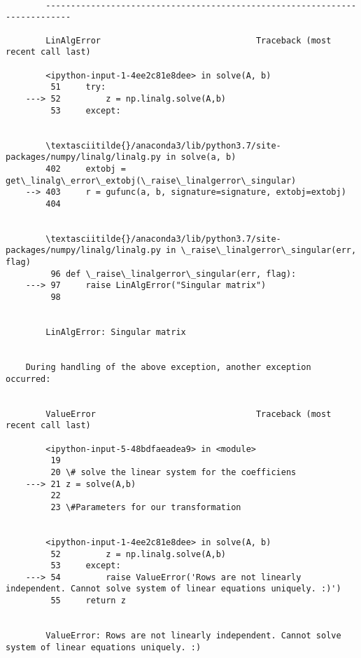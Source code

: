 \documentclass[11pt]{article}
\begin{document}
    \begin{Verbatim}[commandchars=\\\{\}]

        ---------------------------------------------------------------------------

        LinAlgError                               Traceback (most recent call last)

        <ipython-input-1-4ee2c81e8dee> in solve(A, b)
         51     try:
    ---> 52         z = np.linalg.solve(A,b)
         53     except:


        \textasciitilde{}/anaconda3/lib/python3.7/site-packages/numpy/linalg/linalg.py in solve(a, b)
        402     extobj = get\_linalg\_error\_extobj(\_raise\_linalgerror\_singular)
    --> 403     r = gufunc(a, b, signature=signature, extobj=extobj)
        404 


        \textasciitilde{}/anaconda3/lib/python3.7/site-packages/numpy/linalg/linalg.py in \_raise\_linalgerror\_singular(err, flag)
         96 def \_raise\_linalgerror\_singular(err, flag):
    ---> 97     raise LinAlgError("Singular matrix")
         98 


        LinAlgError: Singular matrix

        
    During handling of the above exception, another exception occurred:


        ValueError                                Traceback (most recent call last)

        <ipython-input-5-48bdfaeadea9> in <module>
         19 
         20 \# solve the linear system for the coefficiens
    ---> 21 z = solve(A,b)
         22 
         23 \#Parameters for our transformation


        <ipython-input-1-4ee2c81e8dee> in solve(A, b)
         52         z = np.linalg.solve(A,b)
         53     except:
    ---> 54         raise ValueError('Rows are not linearly independent. Cannot solve system of linear equations uniquely. :)')
         55     return z


        ValueError: Rows are not linearly independent. Cannot solve system of linear equations uniquely. :)

    \end{Verbatim}


    
    
    
    
\end{document}
